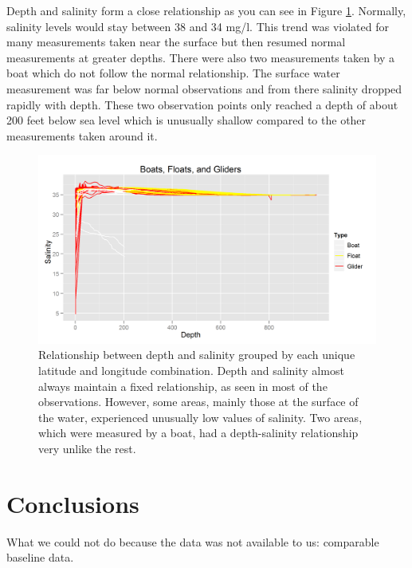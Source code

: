 \documentclass[11pt]{article}
\begin{document}
Depth and salinity form a close relationship as you can see in Figure \ref {Depth-Salinity}. Normally, salinity levels would stay between 38 and 34 mg/l. This trend was violated for many measurements taken near the surface but then resumed normal measurements at greater depths. There were also two measurements taken by a boat which do not follow the normal relationship. The surface water measurement was far below normal observations and from there salinity dropped rapidly with depth. These two observation points only reached a depth of about 200 feet below sea level which is unusually shallow compared to the other measurements taken around it.

\begin{figure}[htbp] %
   \centering
   \includegraphics[width=5in]{deapth-salinity.png} 
   \caption{Relationship between depth and salinity grouped by each unique latitude and longitude combination. Depth and salinity almost always maintain a fixed relationship, as seen in most of the observations. However, some areas, mainly those at the surface of the water, experienced unusually low values of salinity. Two areas, which were measured by a boat, had a depth-salinity relationship very unlike the rest.}
   \label{Depth-Salinity}
\end{figure}

\section{Conclusions}
What we could not do because the data was not available to us: comparable baseline data. 
\end{document}
